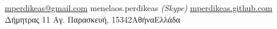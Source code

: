 \documentclass[10pt,a4paper]{article} %
\begin{document}
 

\newcommand{\gr}{\selectlanguage{greek}}
\newcommand{\en}{\selectlanguage{english}}


\noindent\href{mailto:mperdikeas@gmail.com}{mperdikeas@gmail.com}\bull %
menelaos.perdikeas \textit{(Skype)}\bull %
\href{http://mperdikeas.github.com}{mperdikeas.github.com}\\ %
Δήμητρας 11 \bull Αγ. Παρασκευή, 15342\bull Αθήνα\bull Ελλάδα %

\spacedhrule{0.9em}{-0.4em} %



\vspace{-1.3em} %
\end{document}
